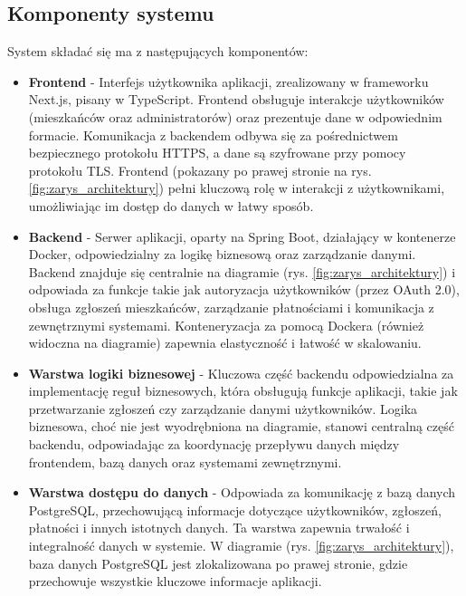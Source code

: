 \subsection{Komponenty systemu}
System składać się ma z następujących komponentów: %
\begin{itemize} 
	\item \textbf{Frontend} - Interfejs użytkownika aplikacji, zrealizowany w frameworku Next.js, pisany w TypeScript. Frontend obsługuje interakcje użytkowników (mieszkańców oraz administratorów) oraz prezentuje dane w odpowiednim formacie. Komunikacja z backendem odbywa się za pośrednictwem bezpiecznego protokołu HTTPS, a dane są szyfrowane przy pomocy protokołu TLS. Frontend (pokazany po prawej stronie na rys. \ref{fig:zarys_architektury}) pełni kluczową rolę w interakcji z użytkownikami, umożliwiając im dostęp do danych w łatwy sposób.

	\item \textbf{Backend} - Serwer aplikacji, oparty na Spring Boot, działający w kontenerze Docker, odpowiedzialny za logikę biznesową oraz zarządzanie danymi. Backend znajduje się centralnie na diagramie (rys. \ref{fig:zarys_architektury}) i odpowiada za funkcje takie jak autoryzacja użytkowników (przez OAuth 2.0), obsługa zgłoszeń mieszkańców, zarządzanie płatnościami i komunikacja z zewnętrznymi systemami. Konteneryzacja za pomocą Dockera (również widoczna na diagramie) zapewnia elastyczność i łatwość w skalowaniu.

	\item \textbf{Warstwa logiki biznesowej} - Kluczowa część backendu odpowiedzialna za implementację reguł biznesowych, która obsługują funkcje aplikacji, takie jak przetwarzanie zgłoszeń czy zarządzanie danymi użytkowników. Logika biznesowa, choć nie jest wyodrębniona na diagramie, stanowi centralną część backendu, odpowiadając za koordynację przepływu danych między frontendem, bazą danych oraz systemami zewnętrznymi.

	\item \textbf{Warstwa dostępu do danych} - Odpowiada za komunikację z bazą danych PostgreSQL, przechowującą informacje dotyczące użytkowników, zgłoszeń, płatności i innych istotnych danych. Ta warstwa zapewnia trwałość i integralność danych w systemie. W diagramie (rys. \ref{fig:zarys_architektury}), baza danych PostgreSQL jest zlokalizowana po prawej stronie, gdzie przechowuje wszystkie kluczowe informacje aplikacji.


\end{itemize}
